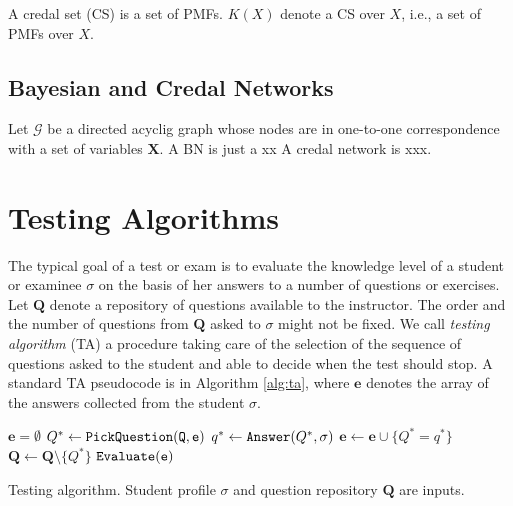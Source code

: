 \documentclass[runningheads]{llncs}
\begin{document}
A credal set (CS) is a set of PMFs. $K(X)$ denote a CS over $X$, i.e., a set of PMFs over $X$. 

\subsection*{Bayesian and Credal Networks}
Let $\mathcal{G}$ be a directed acyclig graph whose nodes are in one-to-one correspondence with a set of variables $\bm{X}$. A BN is just a xx A credal network is xxx.


\section{Testing Algorithms}
The typical goal of a test or exam is to evaluate the knowledge level of a student or examinee $\sigma$ on the basis of her answers to a number of questions or exercises. Let $\bm{Q}$ denote a repository of questions available to the instructor. The order and the number of questions from $\bm{Q}$ asked to $\sigma$ might not be fixed. We call \emph{testing algorithm} (TA) a procedure taking care of the selection of the sequence of questions asked to the student and able to decide when the test should stop. A standard TA pseudocode is in Algorithm \ref{alg:ta}, where $\bm{e}$ denotes the array of the answers collected from the student $\sigma$.



\begin{algorithm}[htp]
    \begin{algorithmic}[1]
    \STATE $\bm{e}=\emptyset$
        \STATE $Q^* \gets \tt{PickQuestion}(\bm{Q},\bm{e})$
        \STATE $q^* \gets {\tt{Answer}}(Q^*,\sigma)$
        \STATE $\bm{e} \gets \bm{e} \cup \{ Q^*=q^* \}$
        \STATE $\bm{Q} \gets \bm{Q} \setminus \{ Q^*\}$
        \ENDWHILE
         $\tt{Evaluate}(\bm{e})$
    \end{algorithmic}\label{alg:ta}
\caption{Testing algorithm. Student profile $\sigma$ and question repository $\bm{Q}$ are inputs.}
\end{algorithm}
\end{document}
